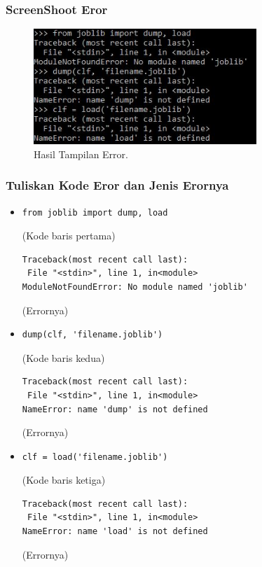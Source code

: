 \subsubsection{ScreenShoot Eror}
\begin{figure}[ht]\centerline{\includegraphics[width=0.75\textwidth]{figures/18.JPG}}\caption{Hasil Tampilan Error.}\end{figure}
\subsubsection{Tuliskan Kode Eror dan Jenis Erornya}
\begin{itemize}
\item \begin{verbatim}from joblib import dump, load\end{verbatim} (Kode baris pertama)
\subitem \begin{verbatim}
Traceback(most recent call last):
 File "<stdin>", line 1, in<module>
ModuleNotFoundError: No module named 'joblib'
\end{verbatim} (Errornya)
\item \begin{verbatim}dump(clf, 'filename.joblib')\end{verbatim} (Kode baris kedua)
\subitem \begin{verbatim}
Traceback(most recent call last):
 File "<stdin>", line 1, in<module>
NameError: name 'dump' is not defined
\end{verbatim} (Errornya)
\item \begin{verbatim}clf = load('filename.joblib')\end{verbatim} (Kode baris ketiga)
\subitem \begin{verbatim}
Traceback(most recent call last):
 File "<stdin>", line 1, in<module>
NameError: name 'load' is not defined
\end{verbatim} (Errornya)
\end{itemize}

